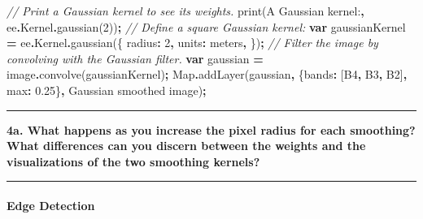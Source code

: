 \documentclass[
]{article}
\newenvironment{Shaded}{\begin{snugshade}}{\end{snugshade}}
\newcommand{\AttributeTok}[1]{\textcolor[rgb]{0.77,0.63,0.00}{#1}}
\newcommand{\BuiltInTok}[1]{#1}
\newcommand{\CommentTok}[1]{\textcolor[rgb]{0.56,0.35,0.01}{\textit{#1}}}
\newcommand{\DataTypeTok}[1]{\textcolor[rgb]{0.13,0.29,0.53}{#1}}
\newcommand{\DecValTok}[1]{\textcolor[rgb]{0.00,0.00,0.81}{#1}}
\newcommand{\FloatTok}[1]{\textcolor[rgb]{0.00,0.00,0.81}{#1}}
\newcommand{\FunctionTok}[1]{\textcolor[rgb]{0.00,0.00,0.00}{#1}}
\newcommand{\KeywordTok}[1]{\textcolor[rgb]{0.13,0.29,0.53}{\textbf{#1}}}
\newcommand{\NormalTok}[1]{#1}
\newcommand{\OperatorTok}[1]{\textcolor[rgb]{0.81,0.36,0.00}{\textbf{#1}}}
\newcommand{\StringTok}[1]{\textcolor[rgb]{0.31,0.60,0.02}{#1}}
\begin{document}
\begin{enumerate}
\begin{Shaded}
\begin{Highlighting}[]
\CommentTok{// Print a Gaussian kernel to see its weights.}
\FunctionTok{print}\NormalTok{(}\StringTok{\textquotesingle{}A Gaussian kernel:\textquotesingle{}}\OperatorTok{,}\NormalTok{ ee}\OperatorTok{.}\AttributeTok{Kernel}\OperatorTok{.}\FunctionTok{gaussian}\NormalTok{(}\DecValTok{2}\NormalTok{))}\OperatorTok{;}
\CommentTok{// Define a square Gaussian kernel:}
\KeywordTok{var}\NormalTok{ gaussianKernel }\OperatorTok{=}\NormalTok{ ee}\OperatorTok{.}\AttributeTok{Kernel}\OperatorTok{.}\FunctionTok{gaussian}\NormalTok{(\{}
 \DataTypeTok{radius}\OperatorTok{:} \DecValTok{2}\OperatorTok{,}
 \DataTypeTok{units}\OperatorTok{:} \StringTok{\textquotesingle{}meters\textquotesingle{}}\OperatorTok{,}
\NormalTok{\})}\OperatorTok{;}
\CommentTok{// Filter the image by convolving with the Gaussian filter.}
\KeywordTok{var}\NormalTok{ gaussian }\OperatorTok{=}\NormalTok{ image}\OperatorTok{.}\FunctionTok{convolve}\NormalTok{(gaussianKernel)}\OperatorTok{;}
\BuiltInTok{Map}\OperatorTok{.}\FunctionTok{addLayer}\NormalTok{(gaussian}\OperatorTok{,}\NormalTok{ \{}\DataTypeTok{bands}\OperatorTok{:}\NormalTok{ [}\StringTok{\textquotesingle{}B4\textquotesingle{}}\OperatorTok{,} \StringTok{\textquotesingle{}B3\textquotesingle{}}\OperatorTok{,} \StringTok{\textquotesingle{}B2\textquotesingle{}}\NormalTok{]}\OperatorTok{,} \DataTypeTok{max}\OperatorTok{:} \FloatTok{0.25}\NormalTok{\}}\OperatorTok{,} \StringTok{\textquotesingle{}Gaussian smoothed image\textquotesingle{}}\NormalTok{)}\OperatorTok{;}
\end{Highlighting}
\end{Shaded}
\end{enumerate}

\begin{center}\rule{0.5\linewidth}{0.5pt}\end{center}

\textbf{4a. What happens as you increase the pixel radius for each smoothing? What differences can you discern between the weights and the visualizations of the two smoothing kernels?}

\begin{center}\rule{0.5\linewidth}{0.5pt}\end{center}

\hypertarget{edge-detection}{%
\paragraph{Edge Detection}\label{edge-detection}}
\end{document}
